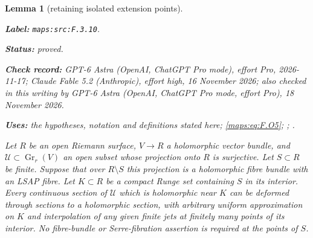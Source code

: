 \documentclass[11pt,a4paper]{article}
\newtheorem{lemma}[lemma]{Lemma}
\theoremstyle{definition}
\newcommand{\StatementRecord}[4]{\par\smallskip\begingroup\upshape\raggedright\noindent\textbf{Label:} \nolinkurl{#1}.\par\noindent\textbf{Status:} #2.\par\noindent\textbf{Check record:} #3.\par\noindent\textbf{Uses:} #4.\par\endgroup\smallskip}
\newcommand{\CurrentChecker}{GPT-6 Astra (OpenAI, ChatGPT Pro mode, effort Pro), 18 November 2026}
\begin{document}
\begin{lemma}[retaining isolated extension points]\label{maps:src:F.3.10}
\StatementRecord{maps:src:F.3.10}{proved}{GPT-6 Astra (OpenAI, ChatGPT Pro mode), effort Pro, 2026-11-17; Claude Fable 5.2 (Anthropic), effort high, 16 November 2026; also checked in this writing by \CurrentChecker}{the hypotheses, notation and definitions stated here; \cref{maps:eq:F.O5}; \cite[Theorem 1.2, preprint p.~3]{ffForstnericPrezelj02}; \cite[Theorem 2.13, p.~9]{IVVOkaOneV5}}


Let $R$ be an open Riemann surface, $V\to R$ a holomorphic vector
bundle, and $\mathscr U\subset\operatorname{Gr}_r(V)$ an open
subset whose projection onto $R$ is surjective.  Let $S\subset R$
be finite.  Suppose that over $R\setminus S$ this projection is
a holomorphic fibre bundle with an LSAP fibre.  Let $K\subset R$
be a compact Runge set containing $S$ in its interior.
Every continuous section of $\mathscr U$ which is holomorphic
near $K$ can be deformed through sections to a holomorphic
section, with arbitrary uniform approximation on $K$ and
interpolation of any given finite jets at finitely many points
of its interior.  No fibre-bundle or Serre-fibration assertion
is required at the points of $S$.

\end{lemma}
\end{document}
